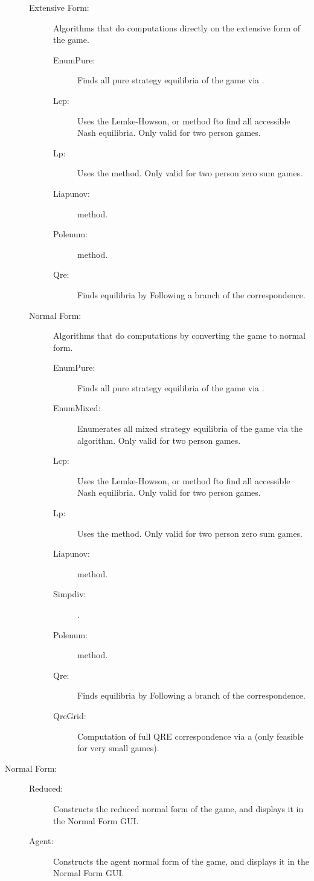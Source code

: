\documentclass[12pt]{report}
\begin{document}
\begin{description}
\begin{description}
\item[Extensive Form:] Algorithms that do computations directly on the extensive form of the game.  
\begin{description}
\item[EnumPure:] Finds all pure strategy equilibria of the game via 
.
\item[Lcp:] Uses the Lemke-Howson, or  method fto find all accessible Nash
equilibria. Only valid for two person games.
\item[Lp:] Uses the  method.  Only
valid for two person zero sum games.
\item[Liapunov:]  method.  
\item[Polenum:]  method.  
\item[Qre:] Finds equilibria by Following a branch of the  correspondence.
\end{description}
\item[Normal Form:] Algorithms that do computations by converting the
game to normal form. 
\begin{description}
\item[EnumPure:] Finds all pure strategy equilibria of the game via 
.
\item[EnumMixed:] Enumerates all mixed strategy equilibria of the
game via the  algorithm. Only valid for two
person games.
\item[Lcp:] Uses the Lemke-Howson, or  method fto find all accessible Nash
equilibria. Only valid for two person games.
\item[Lp:] Uses the  method.  Only
valid for two person zero sum games.
\item[Liapunov:]  method.  
\item[Simpdiv:] . 
\item[Polenum:]  method.  
\item[Qre:] Finds equilibria by Following a branch of the  correspondence.
\item[QreGrid:] Computation of full QRE correspondence via a 
 (only feasible for very small games).
\end{description}
\end{description}
\item[Normal Form:] 
\begin{description}
\item[Reduced:] Constructs the reduced normal form of the game, and
displays it in the Normal Form GUI.
\item[Agent:] Constructs the agent normal form of the game, and
displays it in the Normal Form GUI.
\end{description}
\end{description}
\end{document}
